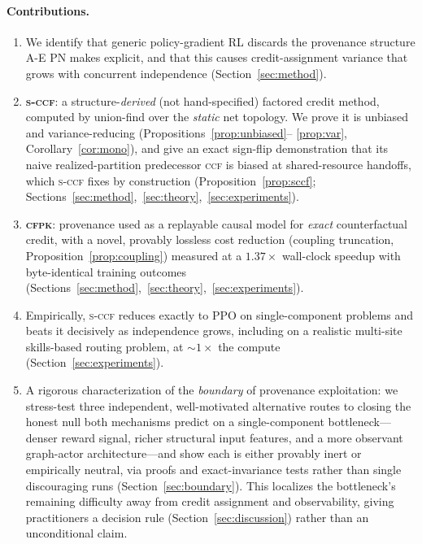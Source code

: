 \documentclass[review,authoryear,3p,times]{elsarticle}
\newcommand{\ccf}{\textsc{ccf}}
\newcommand{\sccf}{\textsc{s-ccf}}
\newcommand{\cfpk}{\textsc{cfpk}}
\begin{document}
\paragraph{Contributions.}
\begin{enumerate}
\item We identify that generic policy-gradient RL discards the provenance
structure A-E PN makes explicit, and that this causes credit-assignment
variance that grows with concurrent independence (Section~\ref{sec:method}).
\item \textbf{\sccf}: a structure-\emph{derived} (not hand-specified) factored
credit method, computed by union-find over the \emph{static} net topology.
We prove it is unbiased and variance-reducing (Propositions~\ref{prop:unbiased}--
\ref{prop:var}, Corollary~\ref{cor:mono}), and give an exact sign-flip
demonstration that its naive realized-partition predecessor \ccf{} is biased
at shared-resource handoffs, which \sccf{} fixes by construction
(Proposition~\ref{prop:sccf}; Sections~\ref{sec:method},~\ref{sec:theory},~\ref{sec:experiments}).
\item \textbf{\cfpk}: provenance used as a replayable causal model for
\emph{exact} counterfactual credit, with a novel, provably lossless cost
reduction (coupling truncation, Proposition~\ref{prop:coupling}) measured at
a $1.37\times$ wall-clock speedup with byte-identical training outcomes
(Sections~\ref{sec:method},~\ref{sec:theory},~\ref{sec:experiments}).
\item Empirically, \sccf{} reduces exactly to PPO on single-component
problems and beats it decisively as independence grows, including on a
realistic multi-site skills-based routing problem, at $\sim\!1\times$ the
compute (Section~\ref{sec:experiments}).
\item A rigorous characterization of the \emph{boundary} of provenance
exploitation: we stress-test three independent, well-motivated alternative
routes to closing the honest null both mechanisms predict on a
single-component bottleneck---denser reward signal, richer structural input
features, and a more observant graph-actor architecture---and show each is
either provably inert or empirically neutral, via proofs and exact-invariance
tests rather than single discouraging runs (Section~\ref{sec:boundary}). This
localizes the bottleneck's remaining difficulty away from credit assignment
and observability, giving practitioners a decision rule (Section~\ref{sec:discussion})
rather than an unconditional claim.
\end{enumerate}
\end{document}
